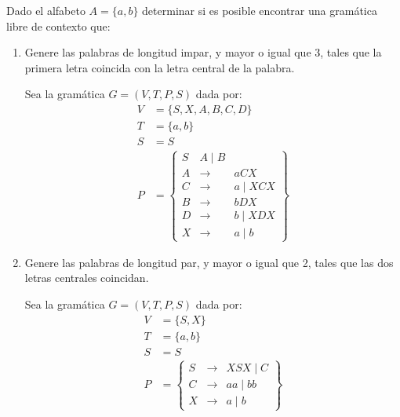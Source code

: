 \begin{ejercicio}
    Dado el alfabeto $A = \{a, b\}$ determinar si es posible encontrar una gramática libre de contexto que:
    \begin{enumerate}
        \item Genere las palabras de longitud impar, y mayor o igual que 3, tales que la primera letra coincida con la letra central de la palabra.
        
        Sea la gramática $G=\left(V,T,P,S\right)$ dada por:
        \begin{align*}
            V &= \{S, X, A, B, C, D\} \\
            T &= \{a,b\} \\
            S &= S \\
            P &= \left\{
                \begin{array}{rcl}
                    S &A\mid B \\
                    A &\rightarrow & aCX \\
                    C & \rightarrow & a \mid XCX \\
                    B &\rightarrow & bDX \\
                    D & \rightarrow & b \mid XDX \\
                    X &\rightarrow & a\mid b
                \end{array}
            \right\}
        \end{align*}
        \item Genere las palabras de longitud par, y mayor o igual que 2, tales que las dos letras centrales coincidan.
        
        Sea la gramática $G=\left(V,T,P,S\right)$ dada por:
        \begin{align*}
            V &= \{S, X\} \\
            T &= \{a,b\} \\
            S &= S \\
            P &= \left\{
                \begin{array}{rcl}
                    S &\rightarrow & XSX\mid C \\
                    C &\rightarrow & aa \mid bb \\
                    X &\rightarrow & a \mid b
                \end{array}
            \right\}
        \end{align*}
    \end{enumerate}
\end{ejercicio}


